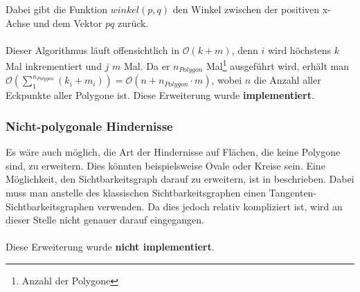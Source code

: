 \documentclass[a4paper, notitlepage, 12pt]{scrartcl}
\begin{document}
\hspace*{-1em}Dabei gibt die Funktion $winkel(p,q)$ den Winkel zwischen der positiven x-Achse und dem Vektor $pq$ zurück.\\ \\
Dieser Algorithmus läuft offensichtlich in $\mathcal{O}(k + m)$, denn $i$ wird höchstens $k$ Mal inkrementiert und $j$ $m$ Mal. Da er $n_{Polygon}$ Mal\footnote{Anzahl der Polygone} ausgeführt wird, erhält man $\mathcal{O}(\sum_{1}^{n_{Polygon}} (k_i + m_i)) = \mathcal{O}(n + n_{Polygon} \cdot m)$, wobei $n$ die Anzahl aller Eckpunkte aller Polygone ist. Diese Erweiterung wurde \textbf{implementiert}.
 \subsubsection{Nicht-polygonale Hindernisse}
 Es wäre auch möglich, die Art der Hindernisse auf Flächen, die keine Polygone sind, zu erweitern. Dies könnten beispielsweise Ovale oder Kreise sein. Eine Möglichkeit, den Sichtbarkeitsgraph darauf zu erweitern, ist in \cite{Src:arcvis} beschrieben. Dabei muss man anstelle des klassischen Sichtbarkeitsgraphen einen Tangenten-Sichtbarkeitsgraphen verwenden. Da dies jedoch relativ kompliziert ist, wird an dieser Stelle nicht genauer darauf eingegangen. \\ \\
 Diese Erweiterung wurde \textbf{nicht implementiert}.
\end{document}
